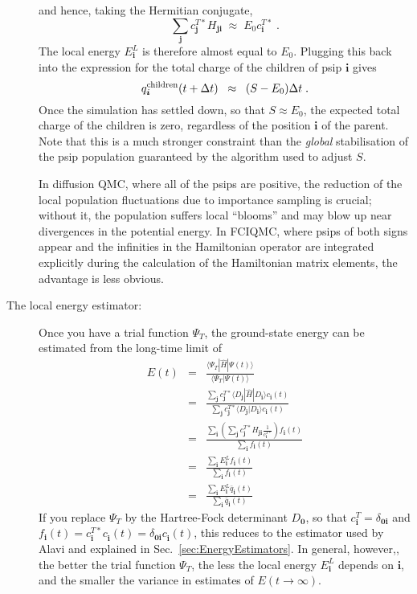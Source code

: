 \documentclass{article}
\newcommand{\bi}{\boldsymbol{i}}
\newcommand{\bj}{\boldsymbol{j}}
\newcommand{\bzero}{\boldsymbol{0}}
\begin{document}
\begin{description}
\begin{displaymath}
  \end{displaymath}
  and hence, taking the Hermitian conjugate,
  \begin{displaymath}
    \sum_{\bj} c_{\bj}^{T\ast} H_{\bj\bi} \; \approx \; E_0
    c_{\bi}^{T\ast} \;.
  \end{displaymath}
  The local energy $E^{L}_{\bi}$ is therefore almost equal to $E_0$.
  Plugging this back into the expression for the total charge of the
  children of psip $\bi$ gives
  \begin{displaymath}
    q_{\bi}^{\rm children}(t + \Delta t) \;\; \approx \;\;
    (S - E_0)\Delta t \;.
  \end{displaymath}
  Once the simulation has settled down, so that $S \approx E_0$, the
  expected total charge of the children is zero, regardless of the
  position $\bi$ of the parent. Note that this is a much stronger
  constraint than the \emph{global} stabilisation of the psip
  population guaranteed by the algorithm used to adjust $S$.

  In diffusion QMC, where all of the psips are positive, the reduction
  of the local population fluctuations due to importance sampling is
  crucial; without it, the population suffers local ``blooms'' and may
  blow up near divergences in the potential energy. In FCIQMC, where
  psips of both signs appear and the infinities in the Hamiltonian
  operator are integrated explicitly during the calculation of the
  Hamiltonian matrix elements, the advantage is less obvious.

  \item[The local energy estimator:] Once you have a trial function
  $\Psi_T$, the ground-state energy can be estimated from the
  long-time limit of
  \begin{eqnarray*}
    E(t) & = & \frac{\langle \Psi_T | \hat{H} | \Psi(t) \rangle}
               {\langle \Psi_T | \Psi(t) \rangle} \\ 
	       & = & \frac{\sum_{\bj} c_{\bj}^{T\ast} \langle D_{\bj} 
	       | \hat{H} | D_{\bi} \rangle c_{\bi}(t)}{\sum_{\bj}
               c_{\bj}^{T\ast} \langle D_{\bj} | D_{\bi} \rangle
               c_{\bi}(t)} \\
	       & = & \frac{\sum_{\bi} \left ( \sum_{\bj}
               c_{\bj}^{T\ast} H_{\bj\bi}
               \frac{1}{c_{\bi}^{T\ast}} \right ) f_{\bi}(t) }
	       {\sum_{\bi} f_{\bi}(t)} \\
	       & = & \frac{\sum_{\bi} E_{\bi}^{L}
               f_{\bi}(t)}{\sum_{\bi} f_{\bi}(t)} \\
	       & = & \frac{\sum_{\bi} E_{\bi}^{L} \bar{q}_{\bi}(t)}
	             {\sum_{\bi} \bar{q}_{\bi}(t)}
  \end{eqnarray*}
  If you replace $\Psi_T$ by the Hartree-Fock determinant
  $D_{\bzero}$, so that $c_{\bi}^{T} = \delta_{\bzero\bi}$ and
  $f_{\bi}(t) = c_{\bi}^{T\ast} c_{\bi}^{\,}(t) =
  \delta_{\bzero\bi}^{\,} c_{\bi}^{\,}(t)$, this reduces to the
  estimator used by Alavi and explained in Sec.\
  \ref{sec:EnergyEstimators}. In general, however,, the better the
  trial function $\Psi_T$, the less the local energy $E_{\bi}^{L}$
  depends on $\bi$, and the smaller the variance in estimates of
  $E(t\rightarrow\infty)$.


\end{description}
\end{document}
